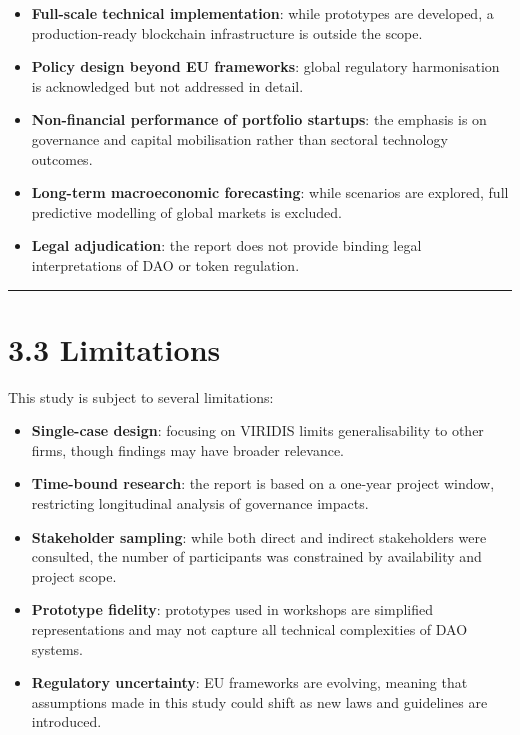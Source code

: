 \documentclass[
  english,
  12pt,
  oneside,
  open=any]{scrbook}
\providecommand{\tightlist}{%
  \setlength{\itemsep}{0pt}\setlength{\parskip}{0pt}}\usepackage{longtable,booktabs,array}
\begin{document}
\begin{itemize}
\tightlist
\item
  \textbf{Full-scale technical implementation}: while prototypes are
  developed, a production-ready blockchain infrastructure is outside the
  scope.\\
\item
  \textbf{Policy design beyond EU frameworks}: global regulatory
  harmonisation is acknowledged but not addressed in detail.\\
\item
  \textbf{Non-financial performance of portfolio startups}: the emphasis
  is on governance and capital mobilisation rather than sectoral
  technology outcomes.\\
\item
  \textbf{Long-term macroeconomic forecasting}: while scenarios are
  explored, full predictive modelling of global markets is excluded.\\
\item
  \textbf{Legal adjudication}: the report does not provide binding legal
  interpretations of DAO or token regulation.
\end{itemize}

\begin{center}\rule{0.5\linewidth}{0.5pt}\end{center}

\section{3.3 Limitations}\label{sec-limits}

This study is subject to several limitations:

\begin{itemize}
\tightlist
\item
  \textbf{Single-case design}: focusing on VIRIDIS limits
  generalisability to other firms, though findings may have broader
  relevance.\\
\item
  \textbf{Time-bound research}: the report is based on a one-year
  project window, restricting longitudinal analysis of governance
  impacts.\\
\item
  \textbf{Stakeholder sampling}: while both direct and indirect
  stakeholders were consulted, the number of participants was
  constrained by availability and project scope.\\
\item
  \textbf{Prototype fidelity}: prototypes used in workshops are
  simplified representations and may not capture all technical
  complexities of DAO systems.\\
\item
  \textbf{Regulatory uncertainty}: EU frameworks are evolving, meaning
  that assumptions made in this study could shift as new laws and
  guidelines are introduced.
\end{itemize}
\end{document}
